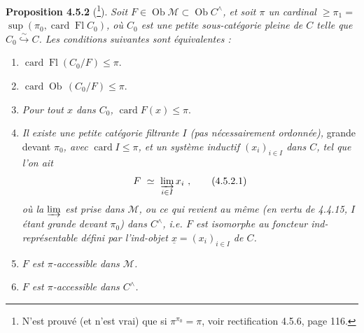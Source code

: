 \documentclass[11pt]{article}
\newcommand{\msp}[1]{\marginpar{\footnotesize [#1]}}
\newcommand{\card}{\operatorname{card}}
\newcommand{\Fl}{\operatorname{Fl}}
\newcommand{\Ob}{\operatorname{Ob}}
\begin{document}
\textbf{Proposition 4.5.2} (\footnote{N'est prouvé (et n'est vrai) que si $\pi^{\pi_0} = \pi$, voir rectification 4.5.6, page 116.}). \textit{Soit $F \in \Ob\mathcal{M} \subset \Ob C^{\wedge}$, et soit $\pi$ un cardinal $\geqslant \pi_1 =$} $\sup(\pi_0, \card\Fl C_0)$\textit{, où $C_0$ est une petite sous-catégorie pleine de $C$ telle que $C_0 \overset{\sim}{\hookrightarrow} C$. Les conditions suivantes sont équivalentes :}
\begin{enumerate}[leftmargin=3em]
\item[\textit{a)}] $\card\Fl(C_0/F) \leqslant \pi$.
\item[\textit{a$'$)}] $\card\Ob\,(C_0/F) \leqslant \pi$.
\item[\textit{a$''$)}] \textit{Pour tout $x$ dans $C_0$,} $\card F(x) \leqslant \pi$.
\item[\textit{b)}] \textit{Il existe une petite catégorie filtrante $I$ (pas nécessairement ordonnée),} grande devant $\pi_0$\textit{, avec} $\card I \leqslant \pi$\textit{, et un système inductif $(x_i)_{i\in I}$ dans $C$, tel que l'on ait}
\[
F \ \simeq\ \varinjlim_{i\in I} x_i\ ,
\tag*{(4.5.2.1)}
\]
\textit{où la $\varinjlim$ est prise dans $\mathcal{M}$, ou ce qui revient au même (en vertu de 4.4.15, $I$ étant grande devant $\pi_0$) dans $C^{\wedge}$, i.e. $F$ est isomorphe au foncteur ind-représentable défini par l'ind-objet $\underline{x} = (x_i)_{i\in I}$ de $C$.}
\item[\textit{c)}] \textit{$F$ est $\pi$-accessible dans $\mathcal{M}$.}
\item[\textit{c$'$)}] \textit{$F$ est $\pi$-accessible dans $C^{\wedge}$.}
\end{enumerate}
\msp{page 108}
\end{document}
